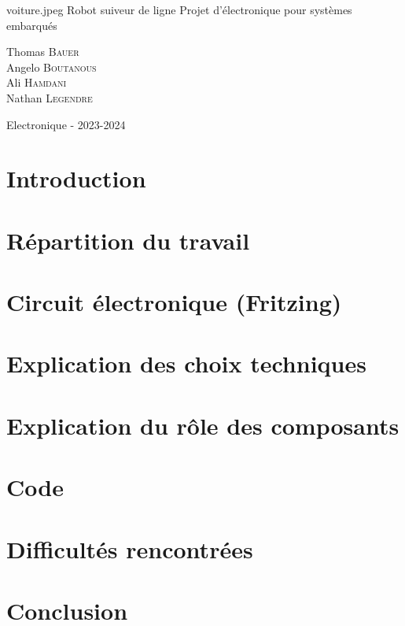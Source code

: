 \documentclass[12pt,a4paper]{article}
\begin{document}
\PageDeGarde
{voiture.jpeg} %
{Robot suiveur de ligne} %
{Projet d'électronique pour systèmes embarqués} %
{

Thomas \textsc{Bauer}\\
Angelo \textsc{Boutanous}\\
Ali \textsc{Hamdani}\\
Nathan \textsc{Legendre}\\

} %
{Electronique - 2023-2024} %


\newpage

\tableofcontents

\newpage

\section*{Introduction}


\section{Répartition du travail}


\section{Circuit électronique (Fritzing)}


\section{Explication des choix techniques}


\section{Explication du rôle des composants}


\section{Code}


\section{Difficultés rencontrées}


\section{Conclusion}

\end{document}
